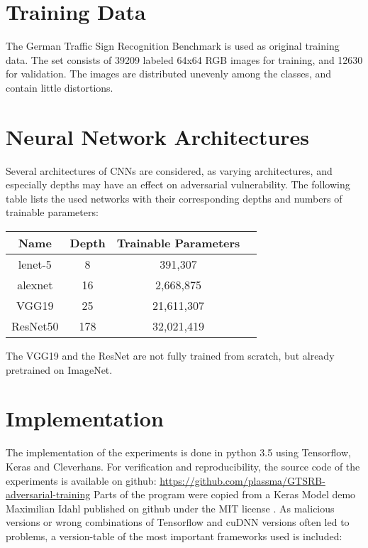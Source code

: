 \documentclass[draft,final]{vutinfth} %
\begin{document}
\section{Training Data}

The German Traffic Sign Recognition Benchmark is used as original training data. The set consists of 39209 labeled 64x64 RGB images for training, and 12630 for validation.
The images are distributed unevenly among the classes, and contain little distortions.


\section{Neural Network Architectures}

Several architectures of CNNs are considered, as varying architectures, and especially depths may have an effect on adversarial vulnerability.
The following table lists the used networks with their corresponding depths and numbers of trainable parameters:

\begin{table}[h]
  \centering
  \begin{tabular}{cccc}
    \toprule
		Name    		& Depth		& Trainable Parameters\\
    \midrule
		lenet-5			&	8				& 391,307							\\
		alexnet 		& 16			& 2,668,875						\\
		VGG19				& 25			& 21,611,307					\\
		ResNet50		& 178			& 32,021,419					\\
    
    \bottomrule
  \end{tabular}
\end{table}


The VGG19 and the ResNet are not fully trained from scratch, but already pretrained on ImageNet.

\section{Implementation}

The implementation of the experiments is done in python 3.5 using Tensorflow, Keras and Cleverhans.
For verification and reproducibility, the source code of the experiments is available on github: \url{https://github.com/plassma/GTSRB-adversarial-training}
Parts of the program were copied from a Keras Model demo Maximilian Idahl published on github under the MIT license \cite{Idahl2018}.
As malicious versions or wrong combinations of Tensorflow and cuDNN versions often led to problems, a version-table of the most important frameworks used is included:
\end{document}
